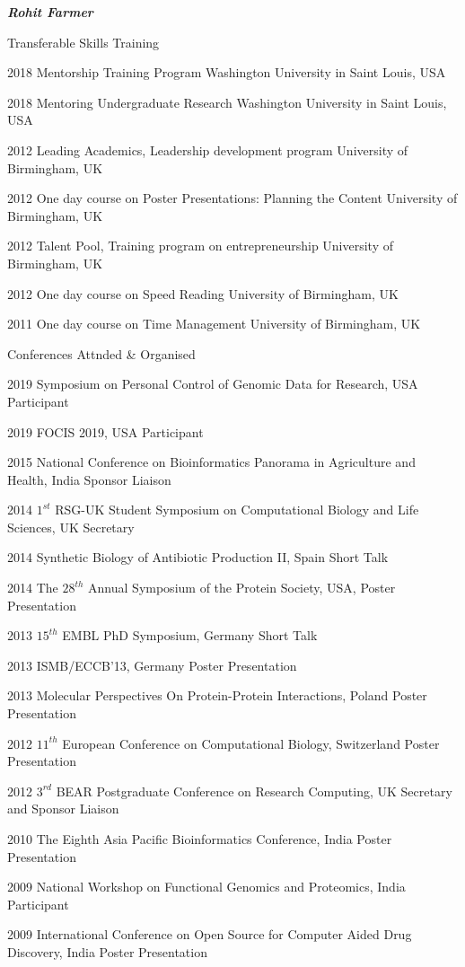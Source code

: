 \documentclass[10pt]{article}
\begin{document}
\begin{cv}{\huge \it \bfseries Rohit Farmer}
\vskip3pt
\begin{cvlist}{Transferable Skills Training}
	\item[2018] Mentorship Training Program \hfill Washington University in Saint Louis, USA
	\item[2018] Mentoring Undergraduate Research \hfill Washington University in Saint Louis, USA
	\item[2012] Leading Academics, Leadership development program \hfill University of Birmingham, UK
	\item[2012] One day course on Poster Presentations: Planning the Content \hfill University of Birmingham, UK
	\item[2012] Talent Pool, Training program on entrepreneurship \hfill University of Birmingham, UK
	\item[2012] One day course on Speed Reading \hfill University of Birmingham, UK
	\item[2011] One day course on Time Management \hfill University of Birmingham, UK
\end{cvlist}

\vskip3pt
\begin{cvlist}{Conferences Attnded \& Organised}
        \item[2019] Symposium on Personal Control of Genomic Data for Research, USA \hfill Participant 
        \item[2019] FOCIS 2019, USA \hfill Participant
        \item[2015] National Conference on Bioinformatics Panorama in Agriculture and Health, India \hfill Sponsor Liaison
	\item[2014] $1^{st}$ RSG-UK Student Symposium on Computational Biology and Life Sciences, UK \hfill Secretary
	\item[2014] Synthetic Biology of Antibiotic Production II, Spain \hfill Short Talk
	\item[2014] The $28^{th}$ Annual Symposium of the Protein Society, USA, \hfill Poster Presentation
	\item[2013] $15^{th}$ EMBL PhD Symposium, Germany \hfill Short Talk
	\item[2013] ISMB/ECCB'13, Germany \hfill Poster Presentation
	\item[2013] Molecular Perspectives On Protein-Protein Interactions, Poland \hfill Poster Presentation
	\item[2012] $11^{th}$ European Conference on Computational Biology, Switzerland \hfill Poster Presentation
	\item[2012] $3^{rd}$ BEAR Postgraduate Conference on Research Computing, UK \hfill Secretary and Sponsor Liaison
	\item[2010] The Eighth Asia Pacific Bioinformatics Conference, India \hfill Poster Presentation
	\item[2009] National Workshop on Functional Genomics and Proteomics, India \hfill Participant
	\item[2009] International Conference on Open Source for Computer Aided Drug Discovery, India \hfill Poster Presentation
\end{cvlist}


\end{cv}
\end{document}
